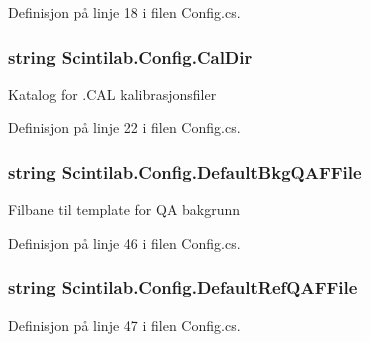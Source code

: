 Definisjon på linje 18 i filen Config.\+cs.

\hypertarget{class_scintilab_1_1_config_a8bb782f1eebd5ba14d686c57bc981298}{
\subsubsection[{Cal\+Dir}]{\setlength{\rightskip}{0pt plus 5cm}string Scintilab.\+Config.\+Cal\+Dir\hspace{0.3cm}{\ttfamily [static]}}}\label{class_scintilab_1_1_config_a8bb782f1eebd5ba14d686c57bc981298}
Katalog for .C\+A\+L kalibrasjonsfiler 

Definisjon på linje 22 i filen Config.\+cs.

\hypertarget{class_scintilab_1_1_config_a022e7110df1c42b1bfcfb167400a2dbf}{
\subsubsection[{Default\+Bkg\+Q\+A\+F\+File}]{\setlength{\rightskip}{0pt plus 5cm}string Scintilab.\+Config.\+Default\+Bkg\+Q\+A\+F\+File\hspace{0.3cm}{\ttfamily [static]}}}\label{class_scintilab_1_1_config_a022e7110df1c42b1bfcfb167400a2dbf}
Filbane til template for Q\+A bakgrunn 

Definisjon på linje 46 i filen Config.\+cs.

\hypertarget{class_scintilab_1_1_config_a9650ecffaee93e2d86f2c635f963b6fb}{
\subsubsection[{Default\+Ref\+Q\+A\+F\+File}]{\setlength{\rightskip}{0pt plus 5cm}string Scintilab.\+Config.\+Default\+Ref\+Q\+A\+F\+File\hspace{0.3cm}{\ttfamily [static]}}}\label{class_scintilab_1_1_config_a9650ecffaee93e2d86f2c635f963b6fb}


Definisjon på linje 47 i filen Config.\+cs.

